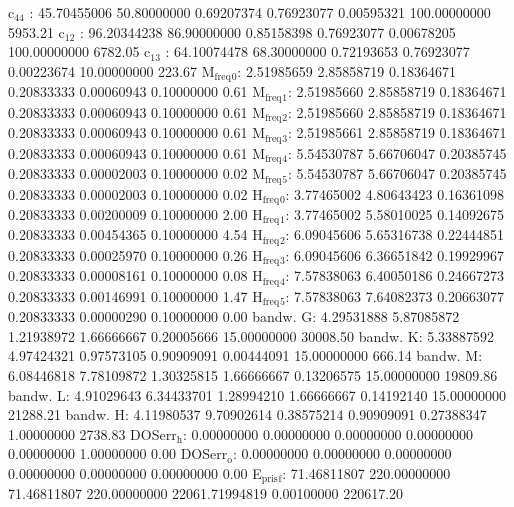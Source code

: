 \documentclass[11pt]{article}
\begin{document}
c\(_{\text{44}}\)    :  45.70455006  50.80000000   0.69207374   0.76923077   0.00595321 100.00000000      5953.21
c\(_{\text{12}}\)    :  96.20344238  86.90000000   0.85158398   0.76923077   0.00678205 100.00000000      6782.05
c\(_{\text{13}}\)    :  64.10074478  68.30000000   0.72193653   0.76923077   0.00223674  10.00000000       223.67
M\(_{\text{freq}}\)\(_{\text{0}}\):   2.51985659   2.85858719   0.18364671   0.20833333   0.00060943   0.10000000         0.61
M\(_{\text{freq}}\)\(_{\text{1}}\):   2.51985660   2.85858719   0.18364671   0.20833333   0.00060943   0.10000000         0.61
M\(_{\text{freq}}\)\(_{\text{2}}\):   2.51985660   2.85858719   0.18364671   0.20833333   0.00060943   0.10000000         0.61
M\(_{\text{freq}}\)\(_{\text{3}}\):   2.51985661   2.85858719   0.18364671   0.20833333   0.00060943   0.10000000         0.61
M\(_{\text{freq}}\)\(_{\text{4}}\):   5.54530787   5.66706047   0.20385745   0.20833333   0.00002003   0.10000000         0.02
M\(_{\text{freq}}\)\(_{\text{5}}\):   5.54530787   5.66706047   0.20385745   0.20833333   0.00002003   0.10000000         0.02
H\(_{\text{freq}}\)\(_{\text{0}}\):   3.77465002   4.80643423   0.16361098   0.20833333   0.00200009   0.10000000         2.00
H\(_{\text{freq}}\)\(_{\text{1}}\):   3.77465002   5.58010025   0.14092675   0.20833333   0.00454365   0.10000000         4.54
H\(_{\text{freq}}\)\(_{\text{2}}\):   6.09045606   5.65316738   0.22444851   0.20833333   0.00025970   0.10000000         0.26
H\(_{\text{freq}}\)\(_{\text{3}}\):   6.09045606   6.36651842   0.19929967   0.20833333   0.00008161   0.10000000         0.08
H\(_{\text{freq}}\)\(_{\text{4}}\):   7.57838063   6.40050186   0.24667273   0.20833333   0.00146991   0.10000000         1.47
H\(_{\text{freq}}\)\(_{\text{5}}\):   7.57838063   7.64082373   0.20663077   0.20833333   0.00000290   0.10000000         0.00
bandw. G:   4.29531888   5.87085872   1.21938972   1.66666667   0.20005666  15.00000000     30008.50
bandw. K:   5.33887592   4.97424321   0.97573105   0.90909091   0.00444091  15.00000000       666.14
bandw. M:   6.08446818   7.78109872   1.30325815   1.66666667   0.13206575  15.00000000     19809.86
bandw. L:   4.91029643   6.34433701   1.28994210   1.66666667   0.14192140  15.00000000     21288.21
bandw. H:   4.11980537   9.70902614   0.38575214   0.90909091   0.27388347   1.00000000      2738.83
DOSerr\(_{\text{h}}\):   0.00000000   0.00000000   0.00000000   0.00000000   0.00000000   1.00000000         0.00
DOSerr\(_{\text{o}}\):   0.00000000   0.00000000   0.00000000   0.00000000   0.00000000   0.00000000         0.00
E\(_{\text{pris}}\)\(_{\text{f}}\):  71.46811807 220.00000000  71.46811807 220.00000000 22061.71994819   0.00100000    220617.20
\end{document}
